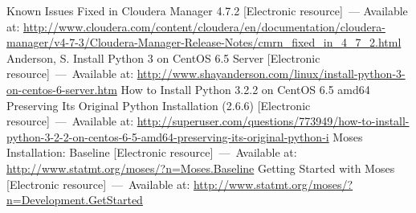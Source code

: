 \newpage

\renewcommand{\bibname}{Список использованных источников}
\begin{thebibliography}{10}
     Known Issues Fixed in Cloudera Manager 4.7.2
        [Electronic resource]~--- Available at: 
        \url{http://www.cloudera.com/content/cloudera/en/documentation/cloudera-manager/v4-7-3/Cloudera-Manager-Release-Notes/cmrn_fixed_in_4_7_2.html}
     Anderson, S. Install Python 3 on CentOS 6.5 Server
        [Electronic resource]~---~Available at: 
        \url{http://www.shayanderson.com/linux/install-python-3-on-centos-6-server.htm}
     How to Install Python 3.2.2 on CentOS 6.5 amd64 Preserving Its Original 
        Python Installation (2.6.6) [Electronic resource]~---~Available at:
        \url{http://superuser.com/questions/773949/how-to-install-python-3-2-2-on-centos-6-5-amd64-preserving-its-original-python-i}
     Moses Installation: Baseline [Electronic resource]~---~Available at:
        \url{http://www.statmt.org/moses/?n=Moses.Baseline}
     Getting Started with Moses [Electronic resource]~---~Available at:
        \url{http://www.statmt.org/moses/?n=Development.GetStarted}
\end{thebibliography}